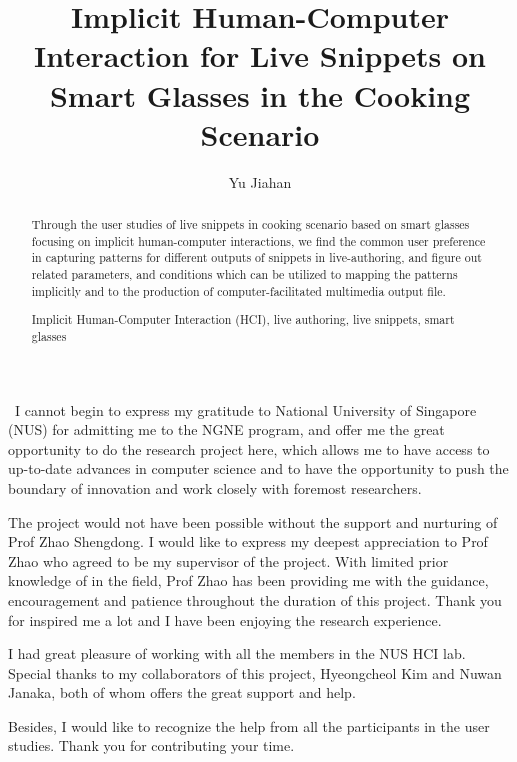 \documentclass[fyp]{socreport}
\begin{document}
\title{Implicit Human-Computer Interaction for Live Snippets on Smart Glasses in the Cooking Scenario}
\author{Yu Jiahan}
\maketitle
\begin{abstract}
Through the user studies of live snippets in cooking scenario based on smart glasses focusing on implicit human-computer interactions, we find the common user preference in capturing patterns for different outputs of snippets in live-authoring, and figure out related parameters, and conditions which can be utilized to mapping the patterns implicitly and to the production of computer-facilitated multimedia output file.

\begin{keywords}
	Implicit Human-Computer Interaction (HCI), live authoring, live snippets, smart glasses
\end{keywords}
\end{abstract}

\begin{acknowledgement}
\quad\, I cannot begin to express my gratitude to National University of Singapore (NUS) for admitting me to the NGNE program, and offer me the great opportunity to do the research project here, which allows me to have access to up-to-date advances in computer science and to have the opportunity to push the boundary of innovation and work closely with foremost researchers.
   
The project would not have been possible without the support and nurturing of Prof Zhao Shengdong. I would like to express my deepest appreciation to Prof Zhao who agreed to be my supervisor of the project. With limited prior knowledge of in the field, Prof Zhao has been providing me with the guidance, encouragement and patience throughout the duration of this project. Thank you for inspired me a lot and I have been enjoying the research experience.
   
I had great pleasure of working with all the members in the NUS HCI lab. Special thanks to my collaborators of this project, Hyeongcheol Kim and Nuwan Janaka, both of whom offers the great support and help. 

Besides, I would like to recognize the help from all the participants in the user studies. Thank you for contributing your time.

\end{acknowledgement}
\listoffigures 
\listoftables
\tableofcontents 
\end{document}
